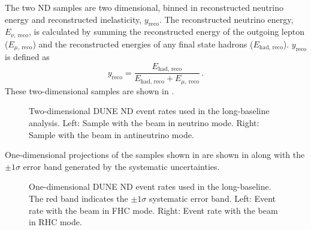 The two ND samples are two dimensional, binned in reconstructed neutrino energy and reconstructed inelasticity, $y_{\text{reco}}$.
The reconstructed neutrino energy, $E_{\nu,~\text{reco}}$, is calculated by summing the reconstructed energy of the outgoing lepton ($E_{\mu,~\text{reco}}$) and the reconstructed energies of any final state hadrons ($E_{\text{had, reco}}$).
$y_{\text{reco}}$ is defined as
\begin{equation}
	y_{\text{reco}} = \frac{E_{\text{had, reco}}}{ E_{\text{had, reco}} + E_{\mu,~\text{reco}} } \, .
\end{equation}
These two-dimensional samples are shown in .

\begin{figure}[h]
	\begin{minipage}[t]{.5\linewidth}
		\begin{adjustbox}{max totalsize=\linewidth, center}
			
		\end{adjustbox}
	\end{minipage}
	\hfill
	\begin{minipage}[t]{.5\linewidth}
		\begin{adjustbox}{max totalsize=\linewidth, center}
			
		\end{adjustbox}
	\end{minipage}
	\caption[Two-dimensional DUNE ND event rates used in the long-baseline analysis]{Two-dimensional DUNE ND event rates used in the long-baseline analysis. Left: Sample with the beam in neutrino mode. Right: Sample with the beam in antineutrino mode.}
	\label{fig:ndEventRates}
\end{figure}

One-dimensional projections of the samples shown in  are shown in  along with the $\pm1\sigma$ error band generated by the systematic uncertainties.
\begin{figure}
	\begin{minipage}[t]{.5\linewidth}
		\begin{adjustbox}{max totalsize=\linewidth, center}
				
		\end{adjustbox}
	\end{minipage}
	\hfill
	\begin{minipage}[t]{.5\linewidth}
		\begin{adjustbox}{max totalsize=\linewidth, center}
				
		\end{adjustbox}
	\end{minipage}
	\caption[One-dimensional DUNE ND event rates used in the long-baseline analysis with $\pm1\sigma$ systematic error band. The full MC statistics are used for these plots (with a scaling factor) with no fluctuations so the statistical uncertainty is not shown.]{One-dimensional DUNE ND event rates used in the long-baseline. The red band indicates the $\pm1\sigma$ systematic error band. Left: Event rate with the beam in FHC mode. Right: Event rate with the beam in RHC mode.}
	\label{fig:ndEventRatesWithError}
\end{figure}


